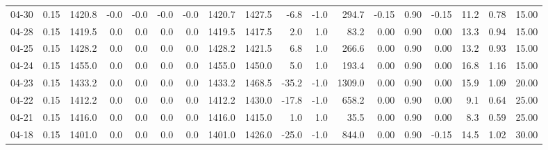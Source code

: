 \begin{threeparttable}
{\begin{tabular}{lrrrrrrrrrrrrrrrrr}
  04-30 &     0.15 & 1420.8 &              -0.0 &              -0.0 &               -0.0 &               -0.0 & 1420.7 & 1427.5 &       -6.8 &                     -1.0 &               294.7 &      -0.15 &      0.90 &          -0.15 &             11.2 &            0.78 &                  15.00 \\
  04-28 &     0.15 & 1419.5 &               0.0 &               0.0 &                0.0 &                0.0 & 1419.5 & 1417.5 &        2.0 &                      1.0 &                83.2 &       0.00 &      0.90 &           0.00 &             13.3 &            0.94 &                  15.00 \\
  04-25 &     0.15 & 1428.2 &               0.0 &               0.0 &                0.0 &                0.0 & 1428.2 & 1421.5 &        6.8 &                      1.0 &               266.6 &       0.00 &      0.90 &           0.00 &             13.2 &            0.93 &                  15.00 \\
  04-24 &     0.15 & 1455.0 &               0.0 &               0.0 &                0.0 &                0.0 & 1455.0 & 1450.0 &        5.0 &                      1.0 &               193.4 &       0.00 &      0.90 &           0.00 &             16.8 &            1.16 &                  15.00 \\
  04-23 &     0.15 & 1433.2 &               0.0 &               0.0 &                0.0 &                0.0 & 1433.2 & 1468.5 &      -35.2 &                     -1.0 &              1309.0 &       0.00 &      0.90 &           0.00 &             15.9 &            1.09 &                  20.00 \\
  04-22 &     0.15 & 1412.2 &               0.0 &               0.0 &                0.0 &                0.0 & 1412.2 & 1430.0 &      -17.8 &                     -1.0 &               658.2 &       0.00 &      0.90 &           0.00 &              9.1 &            0.64 &                  25.00 \\
  04-21 &     0.15 & 1416.0 &               0.0 &               0.0 &                0.0 &                0.0 & 1416.0 & 1415.0 &        1.0 &                      1.0 &                35.5 &       0.00 &      0.90 &           0.00 &              8.3 &            0.59 &                  25.00 \\
  04-18 &     0.15 & 1401.0 &               0.0 &               0.0 &                0.0 &                0.0 & 1401.0 & 1426.0 &      -25.0 &                     -1.0 &               844.0 &       0.00 &      0.90 &          -0.15 &             14.5 &            1.02 &                  30.00 \\

\end{tabular}}
\end{threeparttable}

